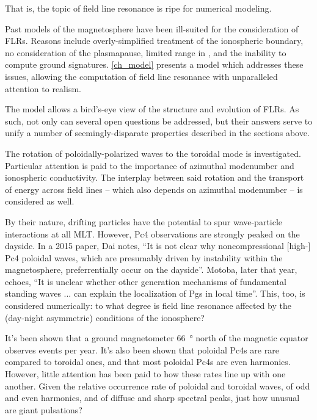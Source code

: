 That is, the topic of field line resonance is ripe for numerical modeling. 

Past models of the magnetosphere have been ill-suited for the consideration of FLRs. Reasons include overly-simplified treatment of the ionospheric boundary, no consideration of the plasmapause, limited range in \azm, and the inability to compute ground signatures. \cref{ch_model} presents a model which addresses these issues, allowing the computation of field line resonance with unparalleled attention to realism. 

The model allows a bird's-eye view of the structure and evolution of FLRs. As such, not only can several open questions be addressed, but their answers serve to unify a number of seemingly-disparate properties described in the sections above. 

The rotation of poloidally-polarized waves to the toroidal mode is investigated. Particular attention is paid to the importance of azimuthal modenumber and ionospheric conductivity. The interplay between said rotation and the transport of energy across field lines -- which also depends on azimuthal modenumber -- is considered as well. 

By their nature, drifting particles have the potential to spur wave-particle interactions at all MLT. However, Pc4 observations are strongly peaked on the dayside. In a 2015 paper, Dai notes, ``It is not clear why noncompressional [high-\azm] Pc4 poloidal waves, which are presumably driven by instability within the magnetosphere, preferrentially occur on the dayside''\cite{dai_2015}. Motoba, later that year, echoes, ``It is unclear whether other generation mechanisms of fundamental standing waves ... can explain the localization of Pgs in local time''\cite{motoba_2015}. This, too, is considered numerically: to what degree is field line resonance affected by the (day-night asymmetric) conditions of the ionosphere? 


It's been shown that a ground magnetometer \SI{66}{\degree} north of the magnetic equator observes  events per year. It's also been shown that poloidal Pc4s are rare compared to toroidal ones, and that most poloidal Pc4s are even harmonics. However, little attention has been paid to how these rates line up with one another. Given the relative occurrence rate of poloidal and toroidal waves, of odd and even harmonics, and of diffuse and sharp spectral peaks, just how unusual are giant pulsations? 


